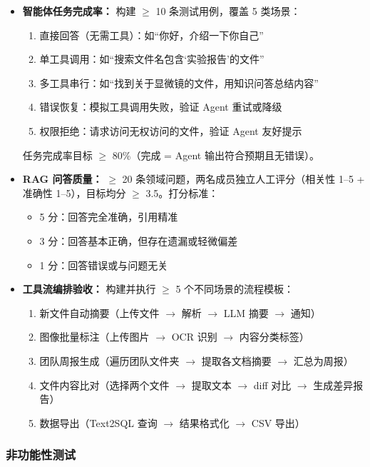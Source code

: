 \documentclass[a4paper,zihao=-4]{ctexart}
\begin{document}
\begin{itemize}
  \item \textbf{智能体任务完成率：} 构建 $\geq$ 10 条测试用例，覆盖 5 类场景：
        \begin{enumerate}
          \item 直接回答（无需工具）：如“你好，介绍一下你自己”
          \item 单工具调用：如“搜索文件名包含‘实验报告’的文件”
          \item 多工具串行：如“找到关于显微镜的文件，用知识问答总结内容”
          \item 错误恢复：模拟工具调用失败，验证 Agent 重试或降级
          \item 权限拒绝：请求访问无权访问的文件，验证 Agent 友好提示
        \end{enumerate}
        任务完成率目标 $\geq$ 80\%（完成 = Agent 输出符合预期且无错误）。
  \item \textbf{RAG 问答质量：} $\geq$ 20 条领域问题，两名成员独立人工评分（相关性 1--5 + 准确性
        1--5），目标均分
        $\geq$ 3.5。打分标准：
        \begin{itemize}
          \item 5 分：回答完全准确，引用精准
          \item 3 分：回答基本正确，但存在遗漏或轻微偏差
          \item 1 分：回答错误或与问题无关
        \end{itemize}
  \item \textbf{工具流编排验收：} 构建并执行 $\geq$ 5 个不同场景的流程模板：
        \begin{enumerate}
          \item 新文件自动摘要（上传文件 $\to$ 解析 $\to$ LLM 摘要 $\to$ 通知）
          \item 图像批量标注（上传图片 $\to$ OCR 识别 $\to$ 内容分类标签）
          \item 团队周报生成（遍历团队文件夹 $\to$ 提取各文档摘要 $\to$ 汇总为周报）
          \item 文件内容比对（选择两个文件 $\to$ 提取文本 $\to$ diff 对比 $\to$ 生成差异报告）
          \item 数据导出（Text2SQL 查询 $\to$ 结果格式化 $\to$ CSV 导出）
        \end{enumerate}
\end{itemize}

\subsubsection{非功能性测试}
\end{document}
